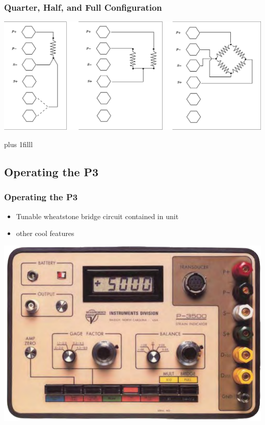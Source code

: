 \documentclass[fleqn]{beamer} %
\newcommand{\sectionIIIsubsectionIItitle}{Quarter, Half, and Full Configuration}
\newcommand{\sectionIIIsubsectionIIItitle}{Operating the P3}
\newcommand{\btVFill}{\vskip0pt plus 1filll}
\begin{document}
			\begin{frame}
				\frametitle{\sectionIIIsubsectionIItitle}

				\bigskip

				\includegraphics[scale=.22]{images/quarter_half_full.png}

				\btVFill
				
			\end{frame}

		\subsection{\sectionIIIsubsectionIIItitle}\label{sectionIIIsubsectionIII}	

			\begin{frame}[containsverbatim]
				\frametitle{\sectionIIIsubsectionIIItitle}\scriptsize
				
				\begin{multicols}{2}

				\begin{itemize}

					\item Tunable wheatstone bridge circuit contained in unit
					\item other cool features

				\end{itemize}

				\includegraphics[scale=.15]{images/p3500_fig1.png}	

				\end{multicols}

						
			
			\end{frame}
\end{document}
